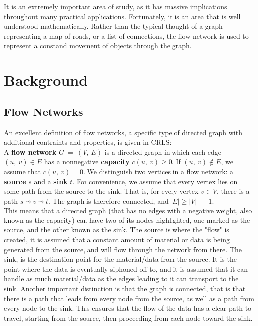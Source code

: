 \documentclass[conference]{IEEEtran}
\begin{document}
It is an extremely important area of study, as it has massive implications throughout many practical applications. Fortunately, it is an area that is well understood mathematically. Rather than the typical thought of a graph representing a map of roads, or a list of connections, the flow network is used to represent a constand movement of objects through the graph.

\section{Background}
\subsection{Flow Networks}
An excellent definition of flow networks, a specific type of directed graph with additional contraints and properties, is given in CRLS:\\

A \textbf{flow network} $G\ =\ (V,\ E)$ is a directed graph in which each edge $(u,\ v) \in E$ has a nonnegative \textbf{capacity} $c(u,\ v) \geq 0$. If $(u,\ v) \notin E$, we assume that $c(u,\ v) = 0$. We distinguish two vertices in a flow network: a \textbf{source} $s$ and a \textbf{sink} $t$. For convenience, we assume that every vertex lies on some path from the source to the sink. That is, for every vertex $v \in V$, there is a path $s \leadsto v \leadsto t$. The graph is therefore connected, and $|E| \geq |V|\ -\ 1$.\cite{CLRS:2001}\\

This means that a directed graph (that has no edges with a negative weight, also known as the capacity) can have two of its nodes highlighted, one marked as the source, and the other known as the sink. The source is where the "flow" is created, it is assumed that a constant amount of material or data is being generated from the source, and will flow through the network from there. The sink, is the destination point for the material/data from the source. It is the point where the data is eventually siphoned off to, and it is assumed that it can handle as much material/data as the edges leading to it can transport to the sink. Another important distinction is that the graph is connected, that is that there is a path that leads from every node from the source, as well as a path from every node to the sink. This ensures that the flow of the data has a clear path to travel, starting from the source, then proceeding from each node toward the sink.
\end{document}
